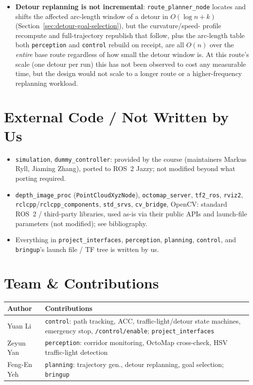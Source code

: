 \documentclass[10pt,twocolumn]{article}
\begin{document}
\begin{itemize}[leftmargin=*]
  average speed (2.7\,m/s) and the peak reached on clear straights
  (7.5\,m/s), though the two have not been separately isolated by
  measurement.
\item \textbf{Detour replanning is not incremental}:
  \texttt{route\_planner\_node} locates and shifts the affected
  arc-length window of a detour in $O(\log n + k)$
  (Section~\ref{sec:detour-goal-selection}), but the curvature/speed-
  profile recompute and full-trajectory republish that follow, plus the
  arc-length table both \texttt{perception} and \texttt{control} rebuild
  on receipt, are all $O(n)$ over the \emph{entire} base route
  regardless of how small the detour window is. At this route's scale
  (one detour per run) this has not been observed to cost any
  measurable time, but the design would not scale to a longer route or
  a higher-frequency replanning workload.
\end{itemize}

\section{External Code / Not Written by Us}

\begin{itemize}[leftmargin=*]
\item \texttt{simulation}, \texttt{dummy\_controller}: provided by the
  course (maintainers Markus Ryll, Jiaming Zhang), ported to ROS~2
  Jazzy; not modified beyond what porting required.
\item \texttt{depth\_image\_proc} (\texttt{PointCloudXyzNode}),
  \texttt{octomap\_server}, \texttt{tf2\_ros}, \texttt{rviz2},
  \texttt{rclcpp}/\texttt{rclcpp\_components}, \texttt{std\_srvs},
  \texttt{cv\_bridge}, OpenCV: standard ROS~2 / third-party libraries,
  used as-is via their public APIs and launch-file parameters (not
  modified); see bibliography.
\item Everything in \texttt{project\_interfaces}, \texttt{perception},
  \texttt{planning}, \texttt{control}, and \texttt{bringup}'s launch file
  / TF tree is written by us.
\end{itemize}

\needspace{4.2cm}
\section{Team \& Contributions}
\begin{table}[H]
\footnotesize
\begin{tabularx}{\columnwidth}{@{}l X@{}}
\toprule
\textbf{Author} & \textbf{Contributions} \\
\midrule
Yuan Li & \texttt{control}: path tracking, ACC, traffic-light/detour state machines, emergency stop, \texttt{/control/enable}; \texttt{project\_interfaces} \\
Zeyun Yan & \texttt{perception}: corridor monitoring, OctoMap cross-check, HSV traffic-light detection \\
Feng-En Yeh & \texttt{planning}: trajectory gen., detour replanning, goal selection; \texttt{bringup} \\
\bottomrule
\end{tabularx}
\end{table}
\end{document}
